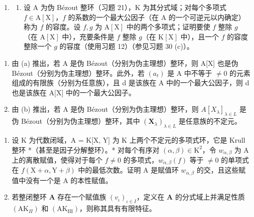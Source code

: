 \begin{enumerate}
\def\labelenumi{\arabic{enumi}.}
\setcounter{enumi}{22}
\tightlist
\item
  \begin{enumerate}
  \def\labelenumii{(\alph{enumii})}
  \tightlist
  \item
    设 A 为伪 Bézout 整环（习题 21），K 为其分式域；对每个多项式 \(f \in \mathrm{A}[\mathrm{X}]\)，\(f\) 的系数的一个最大公因子（在 A 的一个可逆元以内确定）称为 \(f\) 的容度。设 \(f, g\) 为 \(\mathrm{A}[\mathrm{X}]\) 中的两个多项式；证明要使 \(f\) 整除 \(g\)（在 \(\mathrm{A}[\mathrm{X}]\) 中），充要条件是 \(f\) 整除 \(g\)（在 \(\mathrm{K}[\mathrm{X}]\) 中），且一个 \(f\) 的容度整除一个 \(g\) 的容度（使用习题 12）（参见习题 30 (c)）。
  \end{enumerate}
\end{enumerate}

\begin{enumerate}
\def\labelenumi{(\alph{enumi})}
\setcounter{enumi}{1}
\item
  由 (a) 推出，若 A 是伪 Bézout（分别为伪主理想）整环，则 A{[}X{]} 也是伪 Bézout（分别为伪主理想）整环。此外，若 \((a_{t})\) 是 A 中不等于 \(\neq0\) 的元素组成的有限族（分别为任意族），且 d 是该族在 A 中的一个最大公因子，则 d 也是该族在 A{[}X{]} 中的一个最大公因子。
\item
  由 (b) 推出，若 A 是伪 Bézout（分别为伪主理想）整环，则 \(A[X_{\lambda}]_{\lambda \in L}\) 是伪 Bézout（分别为伪主理想）整环，其中 \((\mathbf{X}_{\lambda})_{\lambda \in L}\) 是任意族的不定元。
\end{enumerate}

\begin{enumerate}
\def\labelenumi{\arabic{enumi}.}
\setcounter{enumi}{23}
\item
  设 K 为代数闭域，A = K{[}X, Y{]} 为 K 上两个不定元的多项式环，它是 Krull 整环 *（甚至是因子分解整环）。* 对每个有序对 \((\alpha, \beta) \in \mathrm{K}^{2}\)，令 \(w_{\alpha,\beta}\) 为 A 上的离散赋值，使得对于每个 \(f \neq 0\) 的多项式，\(w_{\alpha,\beta}(f)\) 等于 \(\neq 0\) 的单项式在 \(f(\mathrm{X} + \alpha, \mathrm{Y} + \beta)\) 中的最低次数。证明 A 是赋值环 \(w_{\alpha,\beta}\) 的交，且这些赋值中没有一个是 A 的本性赋值。
\item
  若整闭整环 \(\mathbf{A}\) 存在一个赋值族 \((v_{\iota})_{\iota \in I}\)，定义在 \(\mathbf{A}\) 的分式域上并满足性质 \((\mathrm{AK}_{\Pi})\) 和 \((\mathrm{AK}_{\mathrm{III}})\)，则称其具有有限特征。
\end{enumerate}

